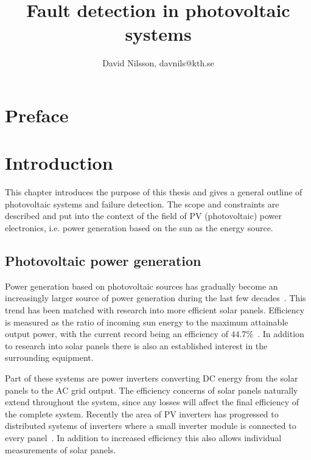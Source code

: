 


\title{Fault detection in photovoltaic systems}
\author{David Nilsson, davnils@kth.se}



\maketitle


\tableofcontents

\chapter*{Preface}
\lipsum[1]

\printglossaries
\cleardoublepage
{}
\listoffigures
\clearpage
{}

\chapter{Introduction}
This chapter introduces the purpose of this thesis and gives a general outline of photovoltaic systems and failure detection.
The scope and constraints are described and put into the context of the field of PV (photovoltaic) power electronics, i.e. power generation based on the sun as the energy source.

\section{Photovoltaic power generation}
Power generation based on photovoltaic sources has gradually become an increasingly larger source of power generation during the last few decades~\cite{Zhao2010thesis}.
This trend has been matched with research into more efficient solar panels.
Efficiency is measured as the ratio of incoming sun energy to the maximum attainable output power, with the current record being an efficiency of $44.7\%$~\cite{Fraunhofer2013}.
In addition to research into solar panels there is also an established interest in the surrounding equipment.

Part of these systems are power inverters converting DC energy from the solar panels to the AC grid output.
The efficiency concerns of solar panels naturally extend throughout the system, since any losses will affect the final efficiency of the complete system.
Recently the area of PV inverters has progressed to distributed systems of inverters where a small inverter module is connected to every panel~\cite{Roman2006}.
In addition to increased efficiency this also allows individual measurements of solar panels.

